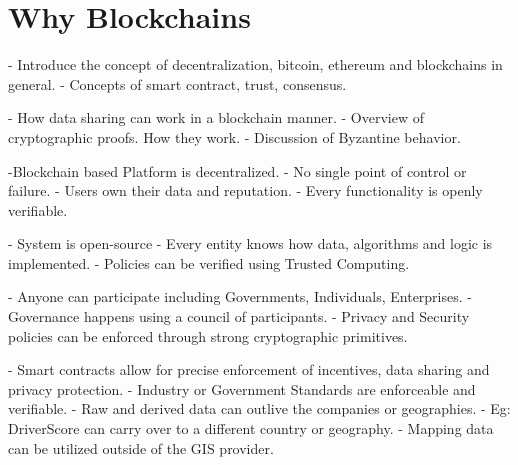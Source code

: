 \section{Why Blockchains}\label{sec:blockchain}

- Introduce the concept of decentralization, bitcoin, ethereum and blockchains in general.
- Concepts of smart contract, trust, consensus.

- How data sharing can work in a blockchain manner. 
- Overview of cryptographic proofs. How they work.
- Discussion of Byzantine behavior.

-Blockchain based Platform is decentralized.
    - No single point of control or failure.
    - Users own their data and reputation.
    - Every functionality is openly verifiable.

- System is open-source
 - Every entity knows how data, algorithms and logic is implemented.
 - Policies can be verified using Trusted Computing.

- Anyone can participate including Governments, Individuals, Enterprises.
- Governance happens using a council of participants.
- Privacy and Security policies can be enforced through strong cryptographic primitives.


- Smart contracts allow for precise enforcement of incentives, data sharing and privacy protection.
- Industry or Government Standards are enforceable and verifiable.
- Raw and derived data can outlive the companies or geographies.
- Eg: DriverScore can carry over to a different country or geography.
- Mapping data can be utilized outside of the GIS provider.


